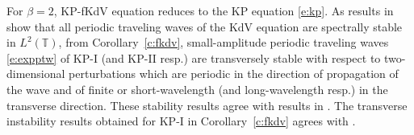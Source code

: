 \documentclass[12pt]{amsart}    %
\newtheorem{corollary}[theorem]{Corollary}
\numberwithin{equation}{section}
\begin{document}


For $\beta=2$, KP-fKdV equation reduces to the KP equation \eqref{e:kp}. As results in \cite{Haragus2008OnSystems,Bottman2009KdVStable} show that all periodic traveling waves of the KdV equation are spectrally stable in $L^2(\mathbb{T})$, from Corollary~\ref{c:fkdv}, small-amplitude periodic traveling waves \eqref{e:expptw} of KP-I (and KP-II resp.) are transversely stable with respect to two-dimensional perturbations which are periodic in the direction of propagation of the wave and of finite or short-wavelength (and long-wavelength resp.) in the transverse direction. These stability results agree with results in \cite{HLP17, Haragus2011TransverseEquation, MD88, Johnson2010TransverseEquation}. The transverse instability results obtained for KP-I in Corollary~\ref{c:fkdv} agrees with \cite{Haragus2011TransverseEquation}. 

\end{document}
